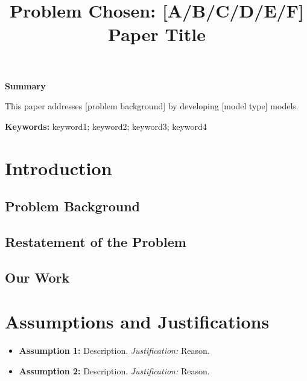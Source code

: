 \documentclass[12pt]{article}
\title{Problem Chosen: [A/B/C/D/E/F]\\[0.5em]\large Paper Title}
\author{}
\date{}
\begin{document}
\maketitle
\thispagestyle{empty}

\begin{center}
\textbf{\Large Summary}
\end{center}

This paper addresses [problem background] by developing [model type] models.

\textbf{Keywords:} keyword1; keyword2; keyword3; keyword4

\newpage
\tableofcontents
\newpage

\section{Introduction}

\subsection{Problem Background}

\subsection{Restatement of the Problem}

\subsection{Our Work}

\section{Assumptions and Justifications}

\begin{itemize}
    \item \textbf{Assumption 1:} Description. \textit{Justification:} Reason.
    \item \textbf{Assumption 2:} Description. \textit{Justification:} Reason.
\end{itemize}
\end{document}
